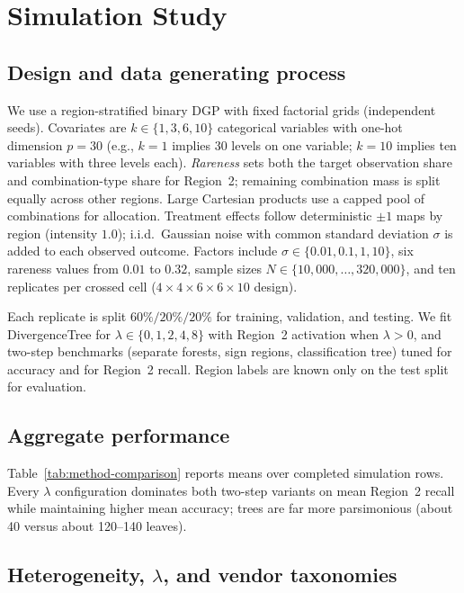 \documentclass[12pt,a4paper]{article}
\begin{document}
\section{Simulation Study}
\label{sec:simulation}

\subsection{Design and data generating process}

We use a region-stratified binary DGP with fixed factorial grids (independent seeds). Covariates are $k\in\{1,3,6,10\}$ categorical variables with one-hot dimension $p{=}30$ (e.g., $k{=}1$ implies 30 levels on one variable; $k{=}10$ implies ten variables with three levels each). \emph{Rareness} sets both the target observation share and combination-type share for Region~2; remaining combination mass is split equally across other regions. Large Cartesian products use a capped pool of combinations for allocation. Treatment effects follow deterministic $\pm 1$ maps by region (intensity $1.0$); i.i.d.\ Gaussian noise with common standard deviation $\sigma$ is added to each observed outcome. Factors include $\sigma\in\{0.01,0.1,1,10\}$, six rareness values from $0.01$ to $0.32$, sample sizes $N\in\{10{,}000,\ldots,320{,}000\}$, and ten replicates per crossed cell ($4{\times}4{\times}6{\times}6{\times}10$ design).

Each replicate is split $60\%/20\%/20\%$ for training, validation, and testing. We fit DivergenceTree for $\lambda\in\{0,1,2,4,8\}$ with Region~2 activation when $\lambda>0$, and two-step benchmarks (separate forests, sign regions, classification tree) tuned for accuracy and for Region~2 recall. Region labels are known only on the test split for evaluation.

\subsection{Aggregate performance}

Table~\ref{tab:method-comparison} reports means over completed simulation rows. Every $\lambda$ configuration dominates both two-step variants on mean Region~2 recall while maintaining higher mean accuracy; trees are far more parsimonious (about 40 versus about 120--140 leaves).



\subsection{Heterogeneity, $\lambda$, and vendor taxonomies}
\end{document}
